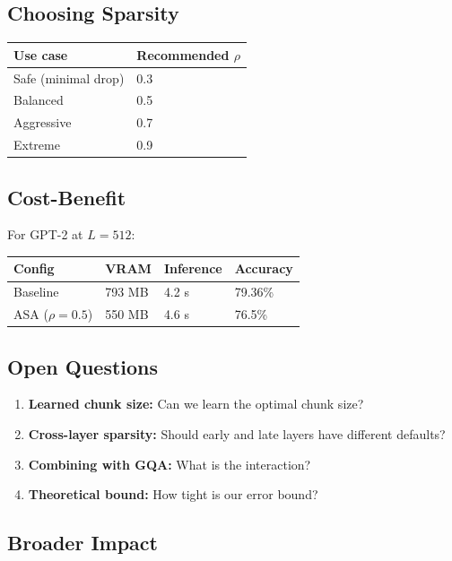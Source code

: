 \subsection{Choosing Sparsity}

\begin{table}[H]
\centering
\small
\begin{tabular}{ll}
\toprule
\textbf{Use case} & \textbf{Recommended $\rho$} \\
\midrule
Safe (minimal drop) & 0.3 \\
Balanced & 0.5 \\
Aggressive & 0.7 \\
Extreme & 0.9 \\
\bottomrule
\end{tabular}
\end{table}

\subsection{Cost-Benefit}

For GPT-2 at $L = 512$:

\begin{table}[H]
\centering
\small
\begin{tabular}{llll}
\toprule
\textbf{Config} & \textbf{VRAM} & \textbf{Inference} & \textbf{Accuracy} \\
\midrule
Baseline & 793 MB & 4.2 s & 79.36\% \\
ASA ($\rho=0.5$) & 550 MB & 4.6 s & 76.5\% \\
\bottomrule
\end{tabular}
\end{table}

\subsection{Open Questions}

\begin{enumerate}
\item \textbf{Learned chunk size:} Can we learn the optimal chunk size?
\item \textbf{Cross-layer sparsity:} Should early and late layers have different
  defaults?
\item \textbf{Combining with GQA:} What is the interaction?
\item \textbf{Theoretical bound:} How tight is our error bound?

\end{enumerate}
\subsection{Broader Impact}

